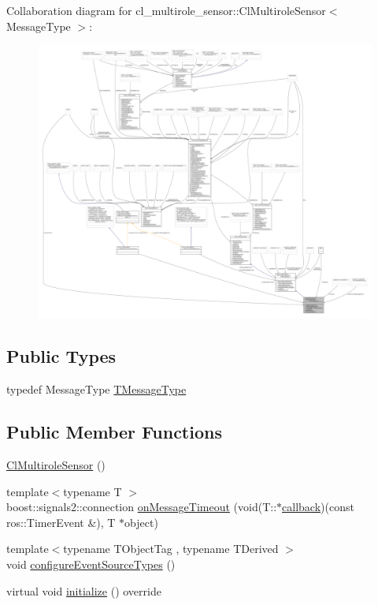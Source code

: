Collaboration diagram for cl\+\_\+multirole\+\_\+sensor\+:\+:Cl\+Multirole\+Sensor$<$ Message\+Type $>$\+:
\nopagebreak
\begin{figure}[H]
\begin{center}
\leavevmode
\includegraphics[width=350pt]{classcl__multirole__sensor_1_1ClMultiroleSensor__coll__graph}
\end{center}
\end{figure}
\subsection*{Public Types}
\begin{DoxyCompactItemize}
\item 
typedef Message\+Type \hyperlink{classcl__multirole__sensor_1_1ClMultiroleSensor_a76f2c1e5c54556bacdaf0aaf809972da}{T\+Message\+Type}
\end{DoxyCompactItemize}
\subsection*{Public Member Functions}
\begin{DoxyCompactItemize}
\item 
\hyperlink{classcl__multirole__sensor_1_1ClMultiroleSensor_a25fcca3996fb5cbd5aa46cae4170e75e}{Cl\+Multirole\+Sensor} ()
\item 
{\footnotesize template$<$typename T $>$ }\\boost\+::signals2\+::connection \hyperlink{classcl__multirole__sensor_1_1ClMultiroleSensor_a9a2ffac7f03e1570bedc246ea4b00078}{on\+Message\+Timeout} (void(T\+::$\ast$\hyperlink{3_2servers_2opencv__perception__node_2opencv__perception__node_8cpp_a050e697bd654facce10ea3f6549669b3}{callback})(const ros\+::\+Timer\+Event \&), T $\ast$object)
\item 
{\footnotesize template$<$typename T\+Object\+Tag , typename T\+Derived $>$ }\\void \hyperlink{classcl__multirole__sensor_1_1ClMultiroleSensor_a48474056b15f9cb24c5582bfbd228187}{configure\+Event\+Source\+Types} ()
\item 
virtual void \hyperlink{classcl__multirole__sensor_1_1ClMultiroleSensor_a3847e19f925f65dd034964eb2d0b3594}{initialize} () override
\end{DoxyCompactItemize}
